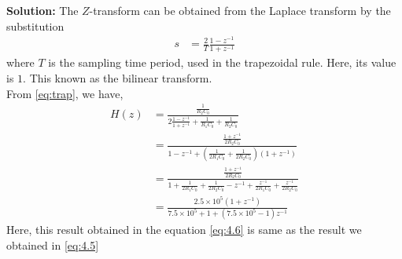\documentclass[journal,12pt,twocolumn]{IEEEtran}
\newcommand{\solution}{\noindent \textbf{Solution: }}
\providecommand{\brak}[1]{\ensuremath{\left(#1\right)}}
\numberwithin{equation}{section}
\renewcommand\thesection{\arabic{section}}
\begin{document}
\begin{enumerate}[label=\thesection.\arabic*.,ref=\thesection.\theenumi]
		\solution The $Z$-transform can be obtained from the Laplace transform by the substitution
		\begin{align}
			s &= \frac{2}{T} \frac{1-z^{-1}}{1+z^{-1}}
		\end{align}
		where $T$ is the sampling time period, used in the trapezoidal rule. Here, its value is $1$. This known as the bilinear transform.\\
		From \eqref{eq:trap}, we have,
		\begin{align}
			H(z) &= \frac{\frac{1}{R_2C_0}}{2\frac{1-z^{-1}}{1+z^{-1}} + \frac{1}{R_1C_0} + \frac{1}{R_2C_0}} \\
			&= \frac{\frac{1 + z^{-1}}{2R_2C_0}}{1-z^{-1}	 + \brak{\frac{1}{2R_1C_0} + \frac{1}{2R_2C_0}}(1 + z^{-1})} \\
			&= \frac{\frac{1 + z^{-1}}{2R_2C_0}}{1 + \frac{1}{2R_1C_0} + \frac{1}{2R_2C_0} - z^{-1} + \frac{z^{-1}}{2R_1C_0} + \frac{z^{-1}}{2R_2C_0}} \\
			\label{eq:4.6}
			&= \frac{2.5\times10^5 (1+z^{-1})}{7.5\times10^5 + 1 + (7.5\times10^5 - 1)z^{-1}}
		\end{align}
		Here, this result obtained in the equation \eqref{eq:4.6} is same as the result we obtained in \eqref{eq:4.5}
		

\end{enumerate}
\end{document}
